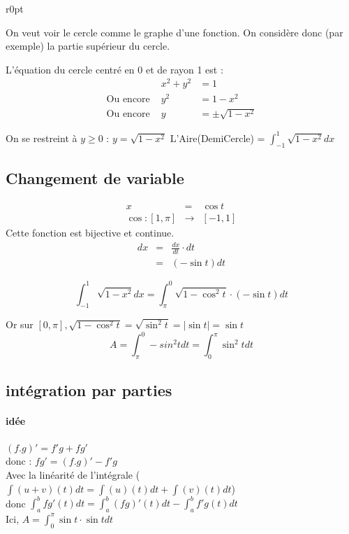 \begin{wrapfigure}[5]{r}{0pt}
\end{wrapfigure}

On veut voir le cercle comme le graphe d'une fonction. On considère donc (par exemple) la partie supérieur du cercle.

L'équation du cercle centré en 0 et de rayon 1 est : \[\begin{array}{rcl}
		& x^2 + y^2 &= 1 \\
		\text{Ou encore } & y^2 &= 1 - x^2 \\
		\text{Ou encore } & y &= \pm\sqrt{1-x^2}\end{array}\]

On se restreint à $y \geq 0$ : $y = \sqrt{1-x^2}$
L'Aire(DemiCercle) = $\int_{-1}^{1} \sqrt{1-x^2} dx$

\subsection{Changement de variable}
\[\begin{array}{rcl}
		x &=& \cos t \\
		\cos:[1,\pi] & \rightarrow & [-1, 1]
\end{array}\]
Cette fonction est bijective et continue.
\[\begin{array}{rcl}
		dx &=& \frac{dx}{dt} \cdot dt \\
		   &=& (-\sin t)dt
\end{array}\]

\[\int_{-1}^1 \sqrt{1-x^2} dx = \int_\pi^0 \sqrt{1-\cos^2t} \cdot (-\sin t) dt\]

Or sur $[0, \pi], \sqrt{1-\cos^2 t} = \sqrt{\sin^2t} = |\sin t| = \sin t$
\[A = \int_\pi^0 -sin^2t dt = \int_0^\pi \sin^2t dt\]

\subsection{intégration par parties}
\paragraph{idée} $(f.g)' = f'g + fg'$ ~\\
donc : $fg' = (f.g)' - f'g$ ~\\
Avec la linéarité de l'intégrale ($\int (u+v)(t) dt = \int (u)(t) dt + \int (v)(t) dt$) ~\\
donc $\int_a^b fg'(t) dt = \int_a^b (fg)'(t)dt - \int_a^b f'g(t) dt$ ~\\
Ici, $A = \int_0^\pi \sin t \cdot \sin t dt$ ~\\

